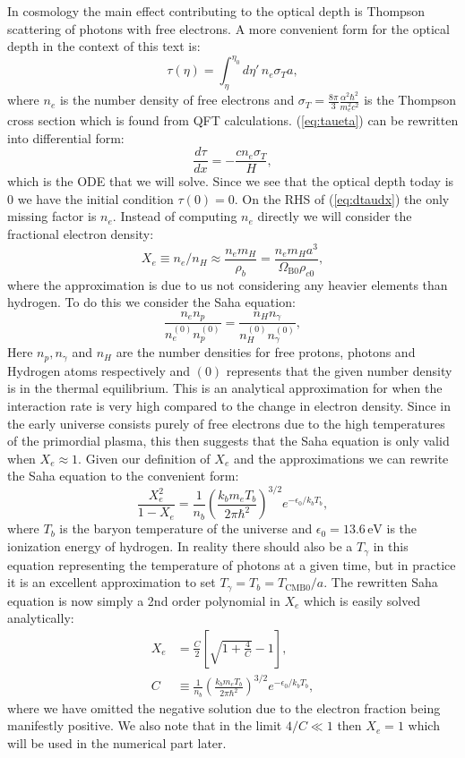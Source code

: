 \documentclass[%
reprint,
 amsmath,amssymb,
 aps,
]{revtex4-2}
\begin{document}
In cosmology the main effect contributing to the optical depth is Thompson scattering of photons with free electrons. A more convenient form for the optical depth in the context of this text is:
\begin{equation}
	\tau(\eta)=\int_\eta^{\eta_0}d\eta'\,n_e\sigma_Ta,\label{eq:taueta}
\end{equation}
where $n_e$ is the number density of free electrons and $\sigma_T=\frac{8\pi}{3}\frac{\alpha^2\hbar^2}{m_e^2c^2}$ is the Thompson cross section which is found from QFT calculations. (\ref{eq:taueta}) can be rewritten into differential form:
\begin{equation}
	\frac{d\tau}{dx}=-\frac{cn_e\sigma_T}{H}, \label{eq:dtaudx}
\end{equation}
which is the ODE that we will solve. Since we see that the optical depth today is $0$ we have the initial condition $\tau(0)=0$. On the RHS of (\ref{eq:dtaudx}) the only missing factor is $n_e$. Instead of computing $n_e$ directly we will consider the fractional electron density:
\[X_e\equiv n_e/n_H\approx\frac{n_em_H}{\rho_b}=\frac{n_em_Ha^3}{\Omega_{\text{B}0}\rho_{c0}},\]
where the approximation is due to us not considering any heavier elements than hydrogen. To do this we consider the Saha equation:
\[\frac{n_en_p}{n_e^{(0)}n_p^{(0)}}=\frac{n_Hn_\gamma}{n_H^{(0)}n_\gamma^{(0)}},\]
Here $n_p,n_\gamma$ and $n_H$ are the number densities for free protons, photons and Hydrogen atoms respectively and $(0)$ represents that the given number density is in the thermal equilibrium. This is an analytical approximation for when the interaction rate is very high compared to the change in electron density. Since in the early universe consists purely of free electrons due to the high temperatures of the primordial plasma, this then suggests that the Saha equation is only valid when $X_e\approx 1$. Given our definition of $X_e$ and the approximations we can rewrite the Saha equation to the convenient form:
\begin{equation}
	\frac{X_e^2}{1-X_e}=\frac{1}{n_b}\left(\frac{k_bm_eT_b}{2\pi\hbar^2}\right)^{3/2}e^{-\epsilon_0/k_bT_b},
\end{equation}
where $T_b$ is the baryon temperature of the universe and $\epsilon_0=13.6\,\text{eV}$ is the ionization energy of hydrogen. In reality there should also be a $T_\gamma$ in this equation representing the temperature of photons at a given time, but in practice it is an excellent approximation to set $T_\gamma=T_b=T_{\text{CMB}0}/a$. The rewritten Saha equation is now simply a 2nd order polynomial in $X_e$ which is easily solved analytically:
\begin{align}
	X_e&=\frac{C}{2}\left[\sqrt{1+\frac{4}{C}}-1 \right],\label{eq:Saha}\\ 
	C&\equiv\frac{1}{n_b}\left(\frac{k_bm_eT_b}{2\pi\hbar^2}\right)^{3/2}e^{-\epsilon_0/k_bT_b},\label{eq:C}
\end{align}
where we have omitted the negative solution due to the electron fraction being manifestly positive. We also note that in the limit $4/C\ll1$ then $X_e=1$ which will be used in the numerical part later.
\end{document}
